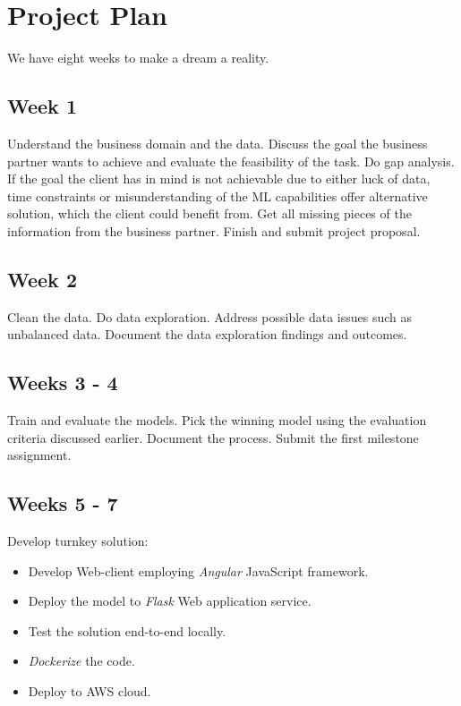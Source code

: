 \hypertarget{project-plan}{%
\section{Project Plan}\label{project-plan}}

We have eight weeks to make a dream a reality.

\hypertarget{week-1}{%
\subsection{Week 1}\label{week-1}}

Understand the business domain and the data. Discuss the goal the
business partner wants to achieve and evaluate the feasibility of the
task. Do gap analysis. If the goal the client has in mind is not
achievable due to either luck of data, time constraints or
misunderstanding of the ML capabilities offer alternative solution,
which the client could benefit from. Get all missing pieces of the
information from the business partner. Finish and submit project
proposal.

\hypertarget{week-2}{%
\subsection{Week 2}\label{week-2}}

Clean the data. Do data exploration. Address possible data issues such
as unbalanced data. Document the data exploration findings and outcomes.

\hypertarget{weeks-3---4}{%
\subsection{Weeks 3 - 4}\label{weeks-3---4}}

Train and evaluate the models. Pick the winning model using the
evaluation criteria discussed earlier. Document the process. Submit the
first milestone assignment.

\hypertarget{weeks-5---7}{%
\subsection{Weeks 5 - 7}\label{weeks-5---7}}

Develop turnkey solution:

\begin{itemize}
\tightlist
\item
  Develop Web-client employing \emph{Angular} JavaScript framework.
\item
  Deploy the model to \emph{Flask} Web application service.
\item
  Test the solution end-to-end locally.
\item
  \emph{Dockerize} the code.
\item
  Deploy to AWS cloud.
\end{itemize}

